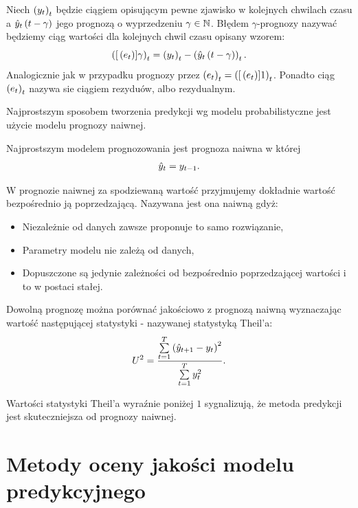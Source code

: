 \documentclass[10pt,a4paper]{book}
\begin{document}
\begin{definition}
Niech $\left( {y_t} \right)_{t}^{} $ będzie ciągiem opisującym pewne zjawisko w kolejnych chwilach czasu a $\predict[t-\gamma]{y}{t}$ jego prognozą o wyprzedzeniu $\gamma \in \mathbb{N}$. Błędem $\gamma$-prognozy nazywać będziemy ciąg wartości dla kolejnych chwil czasu opisany wzorem:
$$
\sequence{\function[{e_t}]{\gamma}}{t}{} = \sequence{y_t}{t}{} - \sequence{\predict[t-\gamma]{y}{t}}{t}{}.
$$
Analogicznie jak w przypadku prognozy przez $\left( {e_t} \right)_{t}^{} = \left( {{{[}\left( {e_t} \right)}]{1} } \right)_{t}^{} $. Ponadto ciąg $\left( {e_t} \right)_{t}^{} $ nazywa sie ciągiem rezyduów, albo rezydualnym.
\end{definition}

Najprostszym sposobem tworzenia predykcji wg modelu probabilistyczne jest użycie modelu prognozy naiwnej.

\begin{definition}
Najprostszym modelem prognozowania jest prognoza naiwna w której
$$
\predict{y}{t} = y_{t-1}.
$$
\end{definition}


W prognozie naiwnej za spodziewaną wartość przyjmujemy dokładnie wartość bezpośrednio ją poprzedzającą. Nazywana jest ona naiwną gdyż:
\begin{itemize}
\item Niezależnie od danych zawsze proponuje to samo rozwiązanie,
\item Parametry modelu nie zależą od danych,
\item Dopuszczone są jedynie zależności od bezpośrednio poprzedzającej wartości i to w postaci stałej.
\end{itemize}

\begin{definition}
Dowolną prognozę można porównać jakościowo z prognozą naiwną wyznaczając wartość następującej statystyki - nazywanej statystyką Theil'a:
$$
U^2 = \frac{\sum_{t = 1}^{T} \bracket{\predict{y}{t+1} - y_t }^2}{\sum_{t=1}^{T} y_t^2}.
$$
\end{definition}
Wartości statystyki Theil'a wyraźnie poniżej $1$ sygnalizują, że metoda predykcji jest skuteczniejsza od prognozy naiwnej.

\section{Metody oceny jakości modelu predykcyjnego}
\end{document}
